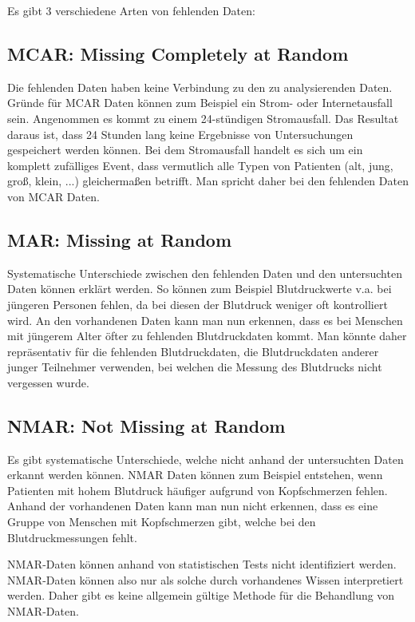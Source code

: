 Es gibt 3 verschiedene Arten von fehlenden Daten:

\subsection{MCAR: Missing Completely at Random}

Die fehlenden Daten haben keine Verbindung zu den zu analysierenden Daten. Gründe für MCAR Daten 
können zum Beispiel ein Strom- oder Internetausfall sein. \autocite[8]{Enders2017} Angenommen es kommt zu einem 24-stündigen Stromausfall.
Das Resultat daraus ist, dass 24 Stunden lang keine Ergebnisse von Untersuchungen gespeichert werden können. Bei dem Stromausfall
handelt es sich um ein komplett zufälliges Event, dass vermutlich alle Typen von Patienten (alt, jung, groß, klein, ...) gleichermaßen betrifft.
Man spricht daher bei den fehlenden Daten von MCAR Daten. 

\subsection{MAR: Missing at Random}

Systematische Unterschiede zwischen den fehlenden Daten und den untersuchten Daten können erklärt 
werden. So können zum Beispiel Blutdruckwerte v.a. bei jüngeren Personen fehlen, da bei diesen 
der Blutdruck weniger oft kontrolliert wird. \autocite[157]{Sterne2009} An den vorhandenen Daten 
kann man nun erkennen, dass es bei Menschen mit jüngerem Alter öfter zu fehlenden Blutdruckdaten 
kommt. Man könnte daher repräsentativ für die fehlenden Blutdruckdaten, die Blutdruckdaten anderer 
junger Teilnehmer verwenden, bei welchen die Messung des Blutdrucks nicht vergessen wurde. 

\subsection{NMAR: Not Missing at Random}

Es gibt systematische Unterschiede, welche nicht anhand der untersuchten Daten erkannt werden 
können. NMAR Daten können zum Beispiel entstehen, wenn Patienten mit hohem Blutdruck häufiger 
aufgrund von Kopfschmerzen fehlen. \autocite[157]{Sterne2009} Anhand der vorhandenen Daten kann
 man nun nicht erkennen, dass es eine Gruppe von Menschen mit Kopfschmerzen gibt, welche bei den 
 Blutdruckmessungen fehlt. 

NMAR-Daten können anhand von statistischen Tests nicht identifiziert werden. NMAR-Daten können 
also nur als solche durch vorhandenes Wissen interpretiert werden. Daher gibt es keine allgemein 
gültige Methode für die Behandlung von NMAR-Daten. \autocite[1088]{Donders2006}

